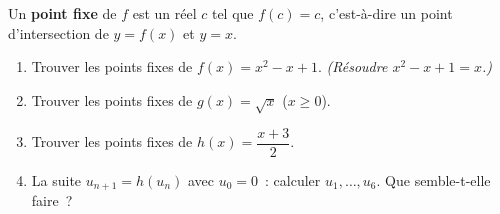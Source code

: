 \begin{challenge}
Un \textbf{point fixe} de $f$ est un r\'eel $c$ tel que $f(c)=c$,
c'est-\`a-dire un point d'intersection de $y=f(x)$ et $y=x$.
\begin{enumerate}
  \item Trouver les points fixes de $f(x)=x^2-x+1$.
        \emph{(R\'esoudre $x^2-x+1=x$.)}
  \item Trouver les points fixes de $g(x)=\sqrt{x}$ ($x\geq0$).
  \item Trouver les points fixes de $h(x)=\dfrac{x+3}{2}$.
  \item La suite $u_{n+1}=h(u_n)$ avec $u_0=0$~: calculer $u_1,\ldots,u_6$.
        Que semble-t-elle faire~?
\end{enumerate}
\end{challenge}

